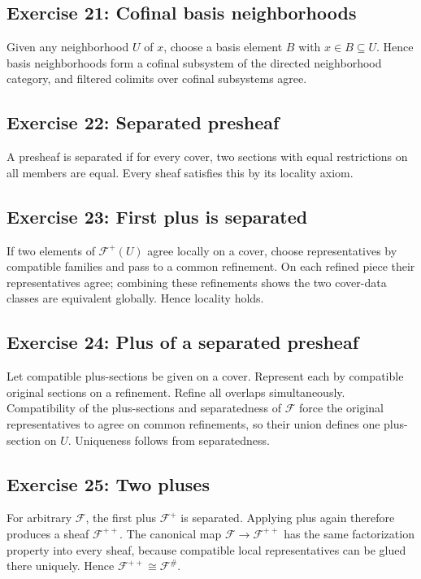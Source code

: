 \subsection*{Exercise 21: Cofinal basis neighborhoods}
\begin{solution}
Given any neighborhood $U$ of $x$, choose a basis element $B$ with $x\in B\subseteq U$.  Hence basis neighborhoods form a cofinal subsystem of the directed neighborhood category, and filtered colimits over cofinal subsystems agree.
\end{solution}

\subsection*{Exercise 22: Separated presheaf}
\begin{solution}
A presheaf is separated if for every cover, two sections with equal restrictions on all members are equal.  Every sheaf satisfies this by its locality axiom.
\end{solution}

\subsection*{Exercise 23: First plus is separated}
\begin{solution}
If two elements of $\mathcal F^+(U)$ agree locally on a cover, choose representatives by compatible families and pass to a common refinement.  On each refined piece their representatives agree; combining these refinements shows the two cover-data classes are equivalent globally.  Hence locality holds.
\end{solution}

\subsection*{Exercise 24: Plus of a separated presheaf}
\begin{solution}
Let compatible plus-sections be given on a cover.  Represent each by compatible original sections on a refinement.  Refine all overlaps simultaneously.  Compatibility of the plus-sections and separatedness of $\mathcal F$ force the original representatives to agree on common refinements, so their union defines one plus-section on $U$.  Uniqueness follows from separatedness.
\end{solution}

\subsection*{Exercise 25: Two pluses}
\begin{solution}
For arbitrary $\mathcal F$, the first plus $\mathcal F^+$ is separated.  Applying plus again therefore produces a sheaf $\mathcal F^{++}$.  The canonical map $\mathcal F\to\mathcal F^{++}$ has the same factorization property into every sheaf, because compatible local representatives can be glued there uniquely.  Hence $\mathcal F^{++}\cong\mathcal F^\#$.
\end{solution}

